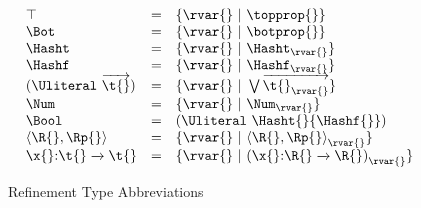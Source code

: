 \begin{figure*}
$$
\begin{array}{lclr}
  \top &=& {\refinenotype {\rvar{}} {\topprop{}}}\\
  \Bot &=& {\refinenotype {\rvar{}} {\botprop{}}}\\
  \Hasht &=& {\refinenotype {\rvar{}} {\isprop {\Hasht} {\rvar{}}}}\\
  \Hashf &=& {\refinenotype {\rvar{}} {\isprop {\Hashf} {\rvar{}}}}\\
  {\Unionsplice {\overrightarrow{\t{}}}}
    &=& {\refinenotype {\rvar{}} {\bigvee \overrightarrow{{\isprop {\t{}} {\rvar{}}}}}} \\
  \Num &=& {\refinenotype {\rvar{}} {\isprop {\Num} {\rvar{}}}}\\
  \Bool &=& {\Unionsplice {\Hasht{} {\Hashf{}}}}\\
  {\Cons {\R{}} {\Rp{}}}
    &=& {\refinenotype {\rvar{}} {\isprop{\Cons {\R{}} {\Rp{}}} {\rvar{}}}}
  \\
                      {\ArrowJustType {\x{}} {\t{}} {\t{}}}
    &=& {\refinenotype {\rvar{}} {\isprop {(\ArrowJustType {\x{}} {\R{}} {\R{}})}{\rvar{}}}}
\end{array}
$$
\caption{Refinement Type Abbreviations}
\end{figure*}
